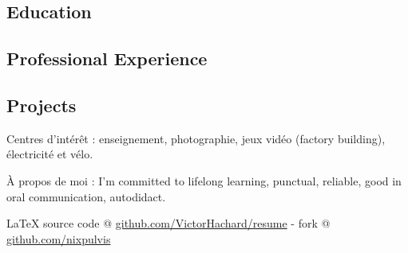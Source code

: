 \documentclass[10pt,a4paper]{article}
\newcommand{\latex}{\LaTeX\xspace}
\newenvironment{indentsection}[1]
{\begin{list}{}
  {\setlength{\leftmargin}{#1}} \item[]
}
{\end{list}}
\begin{document}


\vspace{-0.2em}


\subsection*{Education}


\subsection*{Professional Experience}


\subsection*{Projects}


\begin{indentsection}{\parindent}
\begin{description*}
  \item[Centres d'intérêt :]
    enseignement, photographie, jeux vidéo (factory building), électricité et vélo.
  \item[À propos de moi :]
    I’m committed to lifelong learning, punctual, reliable,
    good in oral communication, autodidact.
\end{description*}
\end{indentsection}


\begin{center}
\footnotesize \latex source code @
\href{http://www.github.com/VictorHachard/resume}
{github.com/VictorHachard/resume} - fork @
\href{http://www.github.com/nixpulvis}
{github.com/nixpulvis} \\
\end{center}
\end{document}
